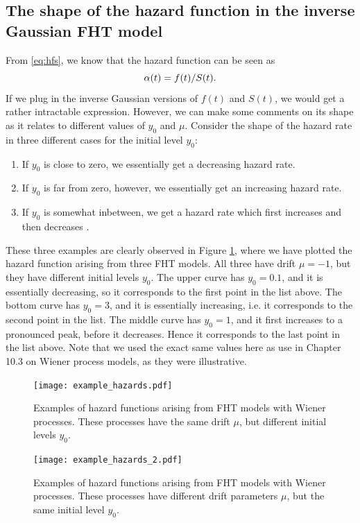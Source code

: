 \subsection{The shape of the hazard function in the inverse Gaussian FHT model}
From \eqref{eq:hfs}, we know that the hazard function can be seen as
\begin{equation*}
    \alpha(t)=f(t)/S(t).
\end{equation*}
If we plug in the inverse Gaussian versions of $f(t)$ and $S(t)$, we would get a rather intractable expression.
However, we can make some comments on its shape as it relates to different values of $y_0$ and $\mu$.
Consider the shape of the hazard rate in three different cases for the initial level $y_0$:
\begin{enumerate}
    \item
        If $y_0$ is close to zero, we essentially get a decreasing hazard rate.
    \item
        If $y_0$ is far from zero, however, we essentially get an increasing hazard rate.
    \item
        If $y_0$ is somewhat inbetween, we get a hazard rate which first increases and then decreases \citep{ABG}.
\end{enumerate}
These three examples are clearly observed in Figure \ref{plot:hazards1}, where we have plotted the hazard function arising from three FHT models.
All three have drift $\mu=-1$, but they have different initial levels $y_0$.
The upper curve has $y_0=0.1$, and it is essentially decreasing, so it corresponds to the first point in the list above.
The bottom curve has $y_0=3$, and it is essentially increasing, i.e. it corresponds to the second point in the list.
The middle curve has $y_0=1$, and it first increases to a pronounced peak, before it decreases.
Hence it corresponds to the last point in the list above.
Note that we used the exact same values here as \citet{ABG} use in Chapter 10.3 on Wiener process models, as they were illustrative.
\begin{figure}
\label{plot:hazards1}
\caption{Examples of hazard functions arising from FHT models with Wiener processes. These processes have the same drift $\mu$, but different initial levels $y_0$.}
\centering
\texttt{[image: example\_hazards.pdf]}
\end{figure}
\begin{figure}
\label{plot:hazards2}
\caption{Examples of hazard functions arising from FHT models with Wiener processes. These processes have different drift parameters $\mu$, but the same initial level $y_0$.}
\centering
\texttt{[image: example\_hazards\_2.pdf]}
\end{figure}
